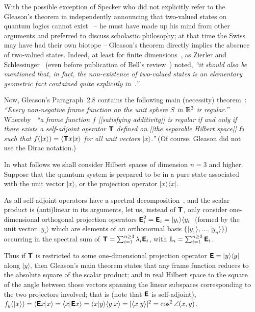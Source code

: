 With the possible exception of Specker who did not explicitly refer to the Gleason's theorem
in independently announcing that two-valued states on quantum logics cannot exist~\cite{specker-60}
-- he must have made up his mind from other arguments and preferred to discuss scholastic philosophy;
at that time the Swiss may have had their own biotope --
Gleason's theorem directly implies the absence of two-valued states.
Indeed, at least for finite dimensions~\cite{Alda,Alda2},
as Zierler and Schlessinger~\cite[p.~259, Example~3.2]{ZirlSchl-65} (even before publication of Bell's review~\cite{bell-66}) noted,
 {\em ``it should also be mentioned that, in fact, the non-existence of two-valued states is an elementary
geometric fact contained quite explicitly in~\cite[Paragraph~2.8]{Gleason}.''}

Now, Gleason's Paragraph~2.8 contains the following main (necessity) theorem~\cite[p.~888]{Gleason}:
{\em ``Every non-negative frame function on the unit sphere $S$ in ${\Bbb R}^3$
ir regular.''}
Whereby~\cite[p.~886]{Gleason}
{\em ``a frame function $f$ [[satisfying additivity]]
is regular if and only if there exists a self-adjoint
operator $\textsf{\textbf{T}}$ defined on [[the separable Hilbert space]] $\mathfrak{H}$ such that
$f( \vert x \rangle ) = \langle \textsf{\textbf{T}}x \vert x\rangle$ for all unit vectors $ \vert x \rangle $.''}
(Of course, Gleason did not use the Dirac notation.)

In what follows we shall consider Hilbert spaces of dimension $n=3$ and higher.
Suppose that the quantum system is prepared to be in a
pure state associated with the unit vector $\vert x \rangle$,
or the projection operator $\vert x \rangle \langle x \vert$.

As all self-adjoint operators have a spectral decomposition~\cite[\S~79]{halmos-vs},
and the scalar product is (anti)linear in its arguments,
let us, instead of $\textsf{\textbf{T}}$, only consider one-dimensional orthogonal projection operators
$\textsf{\textbf{E}}_i^2=\textsf{\textbf{E}}_i = \vert y_i \rangle \langle y_i \vert$
(formed by the unit vector $ \vert y_i \rangle $ which are elements of an orthonormal basis
$\{  \vert y_1 \rangle , \ldots ,  \vert y_n \rangle \}$)
occurring in the spectral sum of
$\textsf{\textbf{T}}=\sum_{i=1}^{n\ge 3} \lambda_i \textsf{\textbf{E}}_i$,
with
${\Bbb I}_n =\sum_{i=1}^{n\ge 3} \textsf{\textbf{E}}_i$.

Thus if $\textsf{\textbf{T}}$ is restricted to some one-dimensional projection operator
$\textsf{\textbf{E}} = \vert y \rangle \langle y \vert$ along $\vert y \rangle $,
then Gleason's main theorem
states that any frame function
reduces to the absolute square of the scalar product;
and in real Hilbert space to the square of the angle between those vectors spanning the linear subspaces corresponding to the two projectors involved;
that is (note that $\textsf{\textbf{E}}$ is self-adjoint),
$f_y( \vert x \rangle ) =
\langle \textsf{\textbf{E}}x \vert x\rangle  =
\langle x \vert \textsf{\textbf{E}} x\rangle  =
\langle x \vert y \rangle \langle y \vert x\rangle  =
\vert \langle x \vert y \rangle
\vert^2 = \cos^2 \angle (x,y)$.

